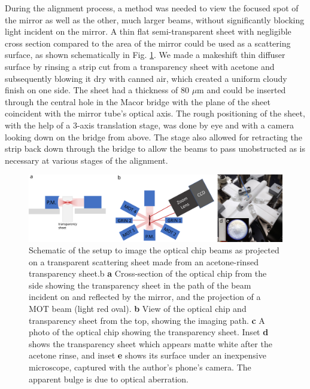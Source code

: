 During the alignment process, a method was needed to view the focused spot of the mirror as well as the other, much larger beams, without significantly blocking light incident on the mirror. A thin flat semi-transparent sheet with negligible cross section compared to the area of the mirror could be used as a scattering surface, as shown schematically in Fig. \ref{fig:scattering_sheet_method}. We made a makeshift thin diffuser surface by rinsing a strip cut from a transparency sheet with acetone and subsequently blowing it dry with canned air, which created a uniform cloudy finish on one side. The sheet had a thickness of 80 $\mu$m and could be inserted through the central hole in the Macor bridge with the plane of the sheet coincident with the mirror tube’s optical axis. The rough positioning of the sheet, with the help of a 3-axis translation stage, was done by eye and with a camera looking down on the bridge from above. The stage also allowed for retracting the strip back down through the bridge to allow the beams to pass unobstructed as is necessary at various stages of the alignment.

\begin{figure}[t!]
    \centering
    \includegraphics[width=\textwidth]{Images/beam_projection_imaging_schematic.pdf}
    \caption{Schematic of the setup to image the optical chip beams as projected on a transparent scattering sheet made from an acetone-rinsed transparency sheet.b  \textbf{a} Cross-section of the optical chip from the side showing the transparency sheet in the path of the beam incident on and reflected by the mirror, and the projection of a MOT beam (light red oval). \textbf{b} View of the optical chip and transparency sheet from the top, showing the imaging path. \textbf{c} A photo of the optical chip showing the transparency sheet. Inset \textbf{d} shows the transparency sheet which appears matte white after the acetone rinse, and inset \textbf{e} shows its surface under an inexpensive microscope, captured with the author's phone's camera. The apparent bulge is due to optical aberration.}
    \label{fig:scattering_sheet_method}
\end{figure}

